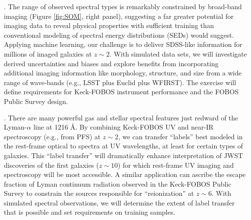 \documentclass[oneside,11pt]{amsart}
\newcounter{chalno}
\newcommand{\chal}[1]{\refstepcounter{chalno}\label{#1}}
\begin{document}
\medskip
%
\chal{phot}
%
.  The range
of observed spectral types is remarkably constrained by broad-band
imaging (Figure \ref{fig:SOM}, right panel), suggesting a far greater
potential for imaging data to reveal physical properties with sufficient
training than conventional modeling of spectral energy distributions
(SEDs) would suggest.  Applying machine learning, our challenge is to
deliver SDSS-like information for millions of imaged galaxies at $z \sim
2$.  With simulated data sets, we will investigate derived uncertainties
and biases and explore benefits from incorporating additional imaging
information like morphology, structure, and size from a wide range of
wave-bands (e.g., LSST plus Euclid plus WFIRST).  The exercise will
define requirements for Keck-FOBOS instrument performance and the FOBOS
Public Survey design.

\medskip
%
\chal{uv}
%
.  There are
many powerful gas and stellar spectral features just redward of the
Lyman-$\alpha$ line at 1216 \AA.  By combining Keck-FOBOS UV and near-IR
spectroscopy (e.g., from PFS) at $z \sim 2$, we can transfer ``labels''
best modeled in the rest-frame optical to spectra at UV wavelengths, at
least for certain types of galaxies.  This ``label transfer'' will
dramatically enhance interpretation of JWST discoveries of the first
galaxies ($z \sim 10$) for which rest-frame UV imaging and spectroscopy
will be most accessible.  A similar application can ascribe the escape
fraction of Lyman continuum radiation observed in the Keck-FOBOS Public
Survey to constrain the sources responsible for ``reionization'' at $z
\sim 6$.  With simulated spectral observations, we will determine the
extent of label transfer that is possible and set requirements on
training samples.
\end{document}
